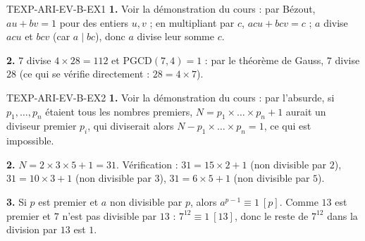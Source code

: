 %
%
%
\begin{corrige}{TEXP-ARI-EV-B-EX1}
\textbf{1.} Voir la démonstration du cours : par Bézout, $au+bv=1$ pour des entiers $u,v$ ; en multipliant par $c$, $acu+bcv=c$ ; $a$ divise $acu$ et $bcv$ (car $a\mid bc$), donc $a$ divise leur somme $c$.

\textbf{2.} $7$ divise $4\times28=112$ et $\mathrm{PGCD}(7,4)=1$ : par le théorème de Gauss, $7$ divise $28$ (ce qui se vérifie directement : $28=4\times7$).
\end{corrige}

\begin{corrige}{TEXP-ARI-EV-B-EX2}
\textbf{1.} Voir la démonstration du cours : par l'absurde, si $p_1,\dots,p_n$ étaient tous les nombres premiers, $N=p_1\times\dots\times p_n+1$ aurait un diviseur premier $p_i$, qui diviserait alors $N-p_1\times\dots\times p_n=1$, ce qui est impossible.

\textbf{2.} $N=2\times3\times5+1=31$. Vérification : $31=15\times2+1$ (non divisible par $2$), $31=10\times3+1$ (non divisible par $3$), $31=6\times5+1$ (non divisible par $5$).

\textbf{3.} Si $p$ est premier et $a$ non divisible par $p$, alors $a^{p-1}\equiv1\ [p]$. Comme $13$ est premier et $7$ n'est pas divisible par $13$ : $7^{12}\equiv1\ [13]$, donc le reste de $7^{12}$ dans la division par $13$ est $1$.
\end{corrige}

